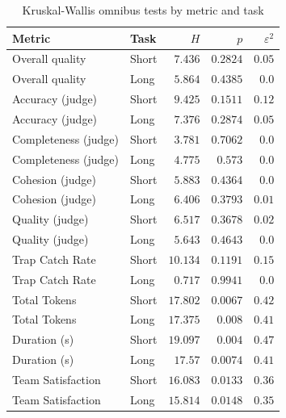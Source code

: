 \begin{table}[htbp]
  \centering
  \small
  \caption{Kruskal-Wallis omnibus tests by metric and task}
  \label{tab:03-kw-omnibus}
\begin{tabular}{llrrr}
    \toprule
    Metric & Task & $H$ & $p$ & $\varepsilon^2$ \\
    \midrule
    Overall quality & Short & $7.436$ & $0.2824$ & $0.05$ \\
    Overall quality & Long & $5.864$ & $0.4385$ & $0.0$ \\
    Accuracy (judge) & Short & $9.425$ & $0.1511$ & $0.12$ \\
    Accuracy (judge) & Long & $7.376$ & $0.2874$ & $0.05$ \\
    Completeness (judge) & Short & $3.781$ & $0.7062$ & $0.0$ \\
    Completeness (judge) & Long & $4.775$ & $0.573$ & $0.0$ \\
    Cohesion (judge) & Short & $5.883$ & $0.4364$ & $0.0$ \\
    Cohesion (judge) & Long & $6.406$ & $0.3793$ & $0.01$ \\
    Quality (judge) & Short & $6.517$ & $0.3678$ & $0.02$ \\
    Quality (judge) & Long & $5.643$ & $0.4643$ & $0.0$ \\
    Trap Catch Rate & Short & $10.134$ & $0.1191$ & $0.15$ \\
    Trap Catch Rate & Long & $0.717$ & $0.9941$ & $0.0$ \\
    Total Tokens & Short & $17.802$ & $0.0067$ & $0.42$ \\
    Total Tokens & Long & $17.375$ & $0.008$ & $0.41$ \\
    Duration (s) & Short & $19.097$ & $0.004$ & $0.47$ \\
    Duration (s) & Long & $17.57$ & $0.0074$ & $0.41$ \\
    Team Satisfaction & Short & $16.083$ & $0.0133$ & $0.36$ \\
    Team Satisfaction & Long & $15.814$ & $0.0148$ & $0.35$ \\
    \bottomrule
\end{tabular}%
\end{table}

